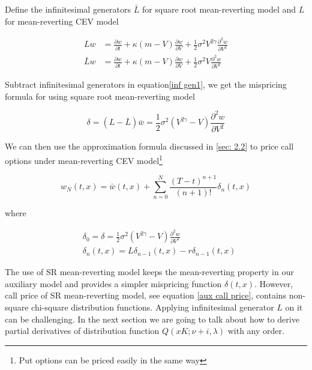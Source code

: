 Define the infinitesimal generators $\bar{L}$ for square root mean-reverting model and $L$ for mean-reverting CEV model

\begin{equation}\label{inf gen1}
    \begin{aligned}
        L w&= \frac{\partial w}{\partial t}+\kappa(m - V) \frac{\partial w}{\partial V}+\frac{1}{2} \sigma^{2} V^{2\gamma} \frac{\partial^{2} w}{\partial V^{2}} \\
        \bar{L} w &= \frac{\partial w}{\partial t}+\kappa(m - V) \frac{\partial w}{\partial V}+\frac{1}{2} \sigma^{2} V \frac{\partial^{2} w}{\partial V^{2}}
    \end{aligned}
\end{equation}

Subtract infinitesimal generators in equation\eqref{inf gen1}, we get the mispricing formula for using square root mean-reverting model

$$
\delta = (L - \bar{L}) \bar{w} = \frac{1}{2} \sigma^{2} (V^{2\gamma} - V) \frac{\partial^{2} w}{\partial V^{2}}
$$

\noindent We can then use the approximation formula discussed in \ref{sec: 2.2} to price call options under mean-reverting CEV model\footnote{Put options can be priced easily in the same way}

\begin{equation} \label{cev approx formula}
    w_{N}(t, x)=\bar{w}(t,x)+\sum_{n=0}^{N} \frac{(T-t)^{n+1}}{(n+1) !} \delta_{n}(t, x)
\end{equation}

\noindent where

\begin{equation}\label{mispricing}
    \begin{aligned}
        &\delta_0 = \delta = \frac{1}{2} \sigma^{2} (V^{2\gamma} - V) \frac{\partial^{2} w}{\partial V^{2}} \\
        &\delta_{n}(t, x)=L \delta_{n-1}(t, x)- r\delta_{n-1}(t, x)
        \end{aligned}
\end{equation}

The use of SR mean-reverting model keeps the mean-reverting property in our auxiliary model and provides a simpler mispricing function $\delta(t,x)$. However, call price of SR mean-reverting model, see equation \eqref{aux call price}, contains non-square chi-square distribution functions. Applying infinitesimal generator $L$ on it can be challenging. In the next section we are going to talk about how to derive partial derivatives of distribution function $Q(xK; \nu+i, \lambda)$ with any order.

